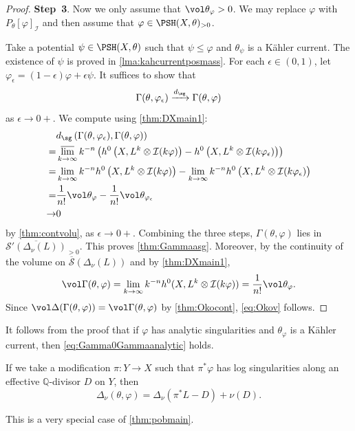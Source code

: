 \begin{proof}
\textbf{Step~3}. Now we only assume that $\vol \theta_{\varphi}>0$.
We may replace $\varphi$ with $P_{\theta}[\varphi]_{\mathcal{I}}$ and then assume that $\varphi\in \PSH(X,\theta)_{>0}$.

Take a potential $\psi\in \PSH(X,\theta)$ such that $\psi \leq \varphi$ and $\theta_{\psi}$ is a Kähler current. The existence of $\psi$ is proved in \cref{lma:kahcurrentposmass}.
For each $\epsilon\in (0,1)$, let $\varphi_{\epsilon}=(1-\epsilon)\varphi+\epsilon\psi$.
It suffices to show that
\[
\Gamma(\theta,\varphi_{\epsilon})\xrightarrow{d_{\sg}}\Gamma(\theta,\varphi)
\]
as $\epsilon \to 0+$.
We compute using \cref{thm:DXmain1}:
\[
\begin{aligned}
    &d_{\sg}\left(\Gamma(\theta,\varphi_{\epsilon}),\Gamma(\theta,\varphi)\right)\\
    =& \varlimsup_{k\to\infty} k^{-n} \left( h^0\left(X,L^k\otimes \mathcal{I}(k\varphi)\right)- h^0\left(X,L^k\otimes \mathcal{I}(k\varphi_{\epsilon})\right) \right)\\
    =& \lim_{k\to\infty}k^{-n}h^0\left(X,L^k\otimes \mathcal{I}(k\varphi)\right)-\lim_{k\to\infty}k^{-n}h^0\left(X,L^k\otimes \mathcal{I}(k\varphi_{\epsilon})\right)\\
    =& \frac{1}{n!}\vol \theta_{\varphi}- \frac{1}{n!}\vol \theta_{\varphi_{\epsilon}}\\
    \to & 0
\end{aligned}
\]
by \cref{thm:contvolu}, as $\epsilon \to 0+$. Combining the three steps, $\Gamma(\theta,\varphi)$ lies in $\overline{\mathcal S'(\Delta_\nu(L))}_{>0}$. This proves \cref{thm:Gammaasg}. Moreover, by the continuity of the volume on $\overline{\mathcal S}(\Delta_\nu(L))$ and by \cref{thm:DXmain1},
\[
\vol \Gamma(\theta,\varphi)=\lim_{k\to\infty}k^{-n}h^0(X,L^k\otimes\mathcal I(k\varphi))=\frac{1}{n!}\vol\theta_\varphi.
\]
Since $\vol\Delta(\Gamma(\theta,\varphi))=\vol\Gamma(\theta,\varphi)$ by \cref{thm:Okocont}, \eqref{eq:Okov} follows.
\end{proof}


\begin{remark}\label{rmk:DeltaanaW0}
It follows from the proof that if $\varphi$ has analytic singularities and $\theta_{\varphi}$ is a Kähler current, then \eqref{eq:Gamma0Gammaanalytic} holds.

If we take a modification $\pi\colon Y\rightarrow X$ such that $\pi^*\varphi$ has log singularities along an effective $\mathbb{Q}$-divisor $D$ on $Y$, then
\begin{equation}\label{eq:DeltaanaW0}
\Delta_{\nu}(\theta,\varphi)=\Delta_{\nu}(\pi^*L-D)+\nu(D).
\end{equation}

This is a very special case of \cref{thm:pobmain}.
\end{remark}







